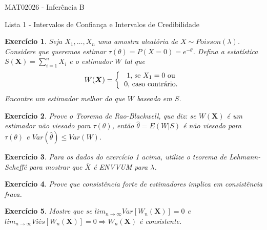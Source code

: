 \documentclass[letter,11pt]{article}
\newtheorem{exer}{Exercício}
\begin{document}
\begin{center}{ \Large MAT02026 - Inferência B }\end{center}

\begin{center}
{\large  \sc Lista 1 - Intervalos de Confiança e Intervalos de Credibilidade}
\end{center}
\vspace{5mm}

\begin{exer} \rm
Seja $X_1, \ldots, X_n$ uma amostra aleatória de $X \sim Poisson(\lambda)$. Considere que queremos estimar $\tau(\theta) = P(X=0) = e^{-\theta}$. Defina a estatística $S(\boldsymbol{X}) = \sum_{i=1}^n X_i$ e o estimador $W$ tal que
\begin{equation}
W(\boldsymbol{X}) = \left\{
\begin{tabular}{c}
1, se $X_1 = 0$ ou \nonumber \\
0, caso contrário. \nonumber
\end{tabular}
\right.
\end{equation}
Encontre um estimador melhor do que $W$ baseado em $S$.
\end{exer}


\begin{exer} \rm
Prove o Teorema de Rao-Blackwell, que diz: se $W(\boldsymbol{X})$ é um estimador não viesado para $\tau(\theta)$, então $\widehat{\theta} = E \left( W \vert S\right)$ é não viesado para $\tau(\theta)$ e $Var ( \widehat{\theta} ) \leq Var \left( W \right)$.
\end{exer}


\begin{exer} \rm
Para os dados do exercício 1 acima, utilize o teorema de Lehmann-Scheffé para mostrar que $\overline{X}$ é ENVVUM para $\lambda$.
\end{exer}


\begin{exer} \rm
Prove que consistência forte de estimadores implica em consistência fraca. %
\end{exer}


\begin{exer} \rm
Mostre que se $lim_{n \rightarrow \infty} Var \left[ W_n(\boldsymbol{X}) \right] = 0$ e $lim_{n \rightarrow \infty} \textit{Viés} \left[ W_n(\boldsymbol{X}) \right] = 0 \Rightarrow W_n(\boldsymbol{X})$ é consistente.
\end{exer}
\end{document}
